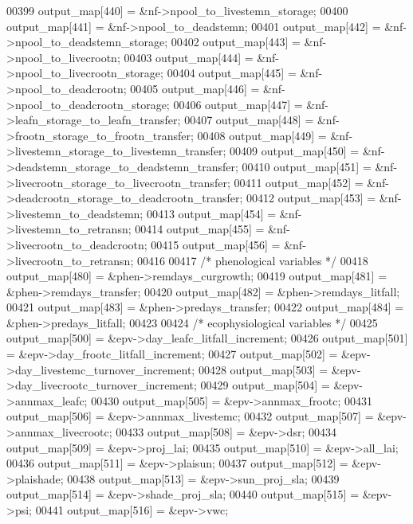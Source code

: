 \begin{DoxyCode}
00399         output\_map[440] = &nf->npool\_to\_livestemn\_storage;
00400         output\_map[441] = &nf->npool\_to\_deadstemn;
00401         output\_map[442] = &nf->npool\_to\_deadstemn\_storage;
00402         output\_map[443] = &nf->npool\_to\_livecrootn;
00403         output\_map[444] = &nf->npool\_to\_livecrootn\_storage;
00404         output\_map[445] = &nf->npool\_to\_deadcrootn;
00405         output\_map[446] = &nf->npool\_to\_deadcrootn\_storage;
00406         output\_map[447] = &nf->leafn\_storage\_to\_leafn\_transfer;
00407         output\_map[448] = &nf->frootn\_storage\_to\_frootn\_transfer;
00408         output\_map[449] = &nf->livestemn\_storage\_to\_livestemn\_transfer;
00409         output\_map[450] = &nf->deadstemn\_storage\_to\_deadstemn\_transfer;
00410         output\_map[451] = &nf->livecrootn\_storage\_to\_livecrootn\_transfer;
00411         output\_map[452] = &nf->deadcrootn\_storage\_to\_deadcrootn\_transfer;
00412         output\_map[453] = &nf->livestemn\_to\_deadstemn;
00413         output\_map[454] = &nf->livestemn\_to\_retransn;
00414         output\_map[455] = &nf->livecrootn\_to\_deadcrootn;
00415         output\_map[456] = &nf->livecrootn\_to\_retransn;
00416         
00417         \textcolor{comment}{/* phenological variables */}
00418         output\_map[480] = &phen->remdays\_curgrowth;
00419         output\_map[481] = &phen->remdays\_transfer;
00420         output\_map[482] = &phen->remdays\_litfall;
00421         output\_map[483] = &phen->predays\_transfer;
00422         output\_map[484] = &phen->predays\_litfall;
00423         
00424         \textcolor{comment}{/* ecophysiological variables */}
00425         output\_map[500] = &epv->day\_leafc\_litfall\_increment;
00426         output\_map[501] = &epv->day\_frootc\_litfall\_increment;
00427         output\_map[502] = &epv->day\_livestemc\_turnover\_increment;
00428         output\_map[503] = &epv->day\_livecrootc\_turnover\_increment;
00429         output\_map[504] = &epv->annmax\_leafc;
00430         output\_map[505] = &epv->annmax\_frootc;
00431         output\_map[506] = &epv->annmax\_livestemc;
00432         output\_map[507] = &epv->annmax\_livecrootc;
00433         output\_map[508] = &epv->dsr;
00434         output\_map[509] = &epv->proj\_lai;
00435         output\_map[510] = &epv->all\_lai;
00436         output\_map[511] = &epv->plaisun;
00437         output\_map[512] = &epv->plaishade;
00438         output\_map[513] = &epv->sun\_proj\_sla;
00439         output\_map[514] = &epv->shade\_proj\_sla;
00440         output\_map[515] = &epv->psi;
00441         output\_map[516] = &epv->vwc;

\end{DoxyCode}

